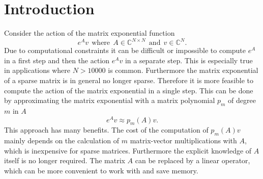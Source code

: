 \documentclass{scrartcl}
\begin{document}
	\setcounter{page}{1}
	
	\section{Introduction}
	Consider the action of the matrix exponential function 
	\[e^Av ~~\text{where}~~ A\in\mathbb{C}^{N\times N} ~~\text{and}~~ v\in\mathbb{C}^N.\] 
	Due to computational constraints it can be difficult or impossible to compute $e^A$ in a first step and then the action $e^Av$ in a separate step. This is especially true in applications where $N>10000$ is common. Furthermore the matrix exponential of a sparse matrix is in general no longer sparse. Therefore it is more feasible to compute the action of the matrix exponential in a single step. This can be done by approximating the matrix exponential with a matrix polynomial $p_m$ of degree $m$ in $A$
	\[e^Av \approx p_m(A)v.\]
	This approach has many benefits. The cost of the computation of $p_m(A)v$ mainly depends on the calculation of $m$ matrix-vector multiplications with $A$, which is inexpensive for sparse matrices. Furthermore the explicit knowledge of $A$ itself is no longer required. The matrix $A$ can be replaced by a linear operator, which can be more convenient to work with and save memory. 
	
\end{document}
